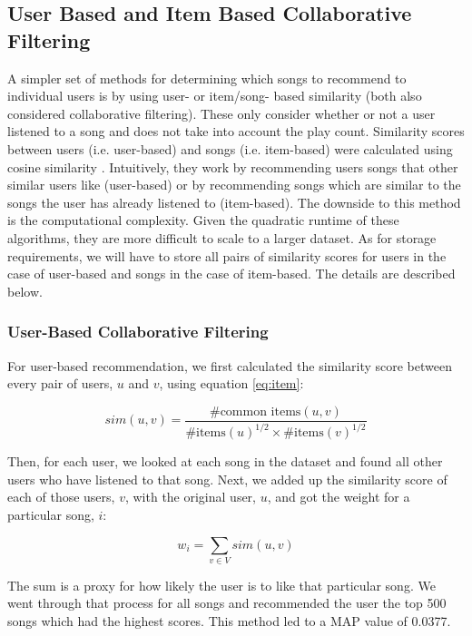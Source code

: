 \documentclass[11pt,preprint]{aastex}
\begin{document}
\subsection{User Based and Item Based Collaborative Filtering}
A simpler set of methods for determining which songs to recommend to individual users is by using user- or item/song- based similarity (both also considered collaborative filtering). These only consider whether or not a user listened to a song and does not take into account the play count. Similarity scores between users (i.e. user-based) and songs (i.e. item-based) were calculated using cosine similarity \citep{aiolli2013preliminary, li2012million}. Intuitively, they work by recommending users songs that other similar users like (user-based) or by recommending songs which are similar to the songs the user has already listened to (item-based). The downside to this method is the computational complexity. Given the quadratic runtime of these algorithms, they are more difficult to scale to a larger dataset. As for storage requirements, we will have to store all pairs of similarity scores for users in the case of user-based and songs in the case of item-based. The details are described below.

\subsubsection{User-Based Collaborative Filtering}
For user-based recommendation, we first calculated the similarity score between every pair of users, $u$ and $v$, using equation \ref{eq:item}:

\begin{equation}
sim(u,v) = \frac{\text{\# common items}(u, v)}{{\text{\# items}(u)}^{1/2} \times {\text{\# items}(v)}^{1/2}}
\label{eq:item}
\end{equation}

Then, for each user, we looked at each song in the dataset and found all other users who have listened to that song. Next, we added up the similarity score of each of those users, $v$, with the original user, $u$, and got the weight for a particular song, $i$:  

$$w_i = \sum_{v \in V} sim(u, v)$$

The sum is a proxy for how likely the user is to like that particular song. We went through that process for all songs and recommended the user the top 500 songs which had the highest scores. This method led to a MAP value of 0.0377.
\end{document}
